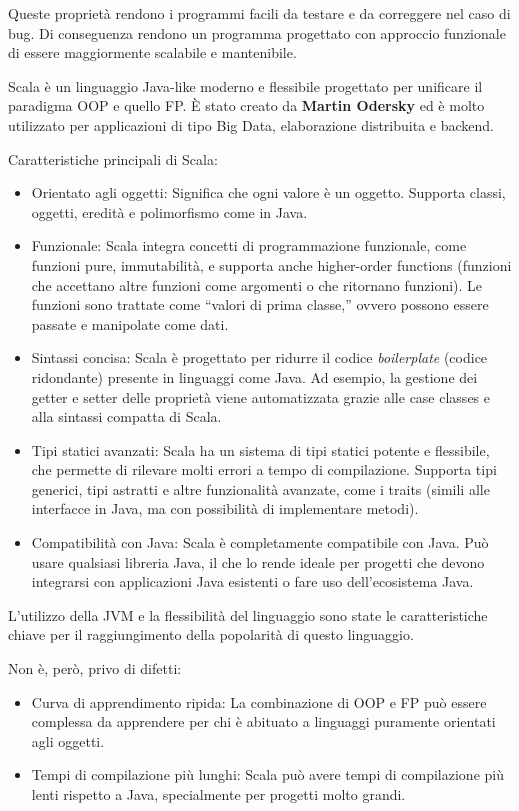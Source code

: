 \documentclass[12pt,a4paper,openright,twoside]{book}
\begin{document}
Queste proprietà rendono i programmi facili da testare e da correggere nel caso di bug. Di conseguenza rendono un programma progettato con approccio funzionale di essere maggiormente scalabile e mantenibile.

Scala è un linguaggio Java-like moderno e flessibile progettato per unificare il paradigma \ac{OOP} e quello \ac{FP}.  È stato creato da \textbf{Martin Odersky} ed è molto utilizzato per applicazioni di tipo Big Data, elaborazione distribuita e backend.

Caratteristiche principali di Scala:
\begin{itemize}
    \item Orientato agli oggetti: Significa che ogni valore è un oggetto. Supporta classi, oggetti, eredità e polimorfismo come in Java.
    \item Funzionale: Scala integra concetti di programmazione funzionale, come funzioni pure, immutabilità, e supporta anche higher-order functions (funzioni che accettano altre funzioni come argomenti o che ritornano funzioni). Le funzioni sono trattate come “valori di prima classe,” ovvero possono essere passate e manipolate come dati.
    \item Sintassi concisa: Scala è progettato per ridurre il codice \textit{boilerplate} (codice ridondante) presente in linguaggi come Java. Ad esempio, la gestione dei getter e setter delle proprietà viene automatizzata grazie alle case classes e alla sintassi compatta di Scala.
    \item Tipi statici avanzati: Scala ha un sistema di tipi statici potente e flessibile, che permette di rilevare molti errori a tempo di compilazione. Supporta tipi generici, tipi astratti e altre funzionalità avanzate, come i traits (simili alle interfacce in Java, ma con possibilità di implementare metodi).
    \item Compatibilità con Java: Scala è completamente compatibile con Java. Può usare qualsiasi libreria Java, il che lo rende ideale per progetti che devono integrarsi con applicazioni Java esistenti o fare uso dell'ecosistema Java.
\end{itemize}

L'utilizzo della \ac{JVM} e la flessibilità del linguaggio sono state le caratteristiche chiave per il raggiungimento della popolarità di questo linguaggio.

Non è, però, privo di difetti:

\begin{itemize}
    \item Curva di apprendimento ripida: La combinazione di OOP e FP può essere complessa da apprendere per chi è abituato a linguaggi puramente orientati agli oggetti.
    \item Tempi di compilazione più lunghi: Scala può avere tempi di compilazione più lenti rispetto a Java, specialmente per progetti molto grandi.
\end{itemize}
\end{document}
